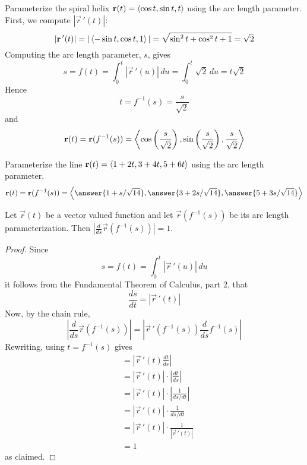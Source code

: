 \documentclass[handout]{ximera}
\begin{document}
\begin{example}[Example 2]
Parameterize the spiral helix $\mathbf r(t) = \left\langle \cos t, \sin t, t\right\rangle$ using the arc length parameter.\\
First, we compute $|\vec r\,'(t)|$:
\[
|\mathbf r\,'(t)| = |\left\langle -\sin t, \cos t, 1\right\rangle| = \sqrt{\sin^2 t + \cos^2 t + 1} = \sqrt 2
\]
Computing the arc length parameter, $s$, gives
\[
s = f(t) = \int_0^t |\vec r\,'(u)| \, du = \int_0^t \sqrt 2 \, du = t \sqrt 2
\]
Hence
\[
t = f^{-1}(s) = \frac{s}{\sqrt 2}
\]
and 
\[
\mathbf r(t) = \mathbf r(f^{-1}(s)) = \left\langle \cos \left(\frac{s}{\sqrt 2}\right), \sin \left(\frac{s}{\sqrt 2}\right),\frac{s}{\sqrt 2}\right\rangle
\]
\end{example}


\begin{problem}[Problem 2]
Parameterize the line $\mathbf r(t) =\left\langle 1+2t, 3+4t, 5+6t\right\rangle$ using the arc length parameter.
\[
\vec r(t) = \vec r(f^{-1}(s)) = \vector{\answer{1 + s/\sqrt{14}}, \answer{3 + 2s/\sqrt{14}}, \answer{5 + 3s/\sqrt{14}}}
\]
\end{problem}




\begin{proposition}
Let $\vec r(t)$ be a vector valued function and let $\vec r(f^{-1}(s))$ be its arc length parameterization.
Then $\left| \frac{d}{ds} \vec r(f^{-1}(s))\right| = 1$.\\
\end{proposition}
\begin{proof}
Since 
\[
s = f(t) = \int_0^t |\vec r \,'(u)|\, du
\]
it follows from the Fundamental Theorem of Calculus, part 2, that
\[
\frac{ds}{dt} = |\vec r \,'(t)|
\]
Now, by the chain rule,
\[
 \left| \frac{d}{ds} \vec r(f^{-1}(s)) \right| = \left|\vec r\,'(f^{-1}(s)) \frac{d}{ds} f^{-1}(s)\right|
 \]
 Rewriting, using $t = f^{-1}(s)$ gives
 \begin{align*}
 &= \left|\vec r\,'(t) \frac{dt}{ds} \right|\\
 &= \left|  \vec r\,'(t)\right| \cdot \left|\frac{dt}{ds}\right|\\
                                             &= \left|  \vec r\,'(t)\right| \cdot \left|\frac{1}{ds/dt}\right|\\
                                             &= \left|  \vec r\,'(t)\right| \cdot \frac{1}{ds/dt}\\
                                             &=\left|  \vec r\,'(t)\right| \cdot \frac{1}{ \left|  \vec r\,'(t)\right|}\\
                                             &= 1
\end{align*}
as claimed.
\end{proof}
\end{document}
